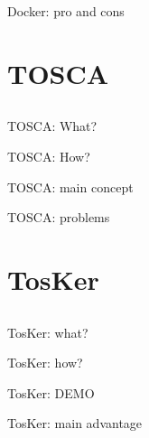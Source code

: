 \documentclass{beamer}
\begin{document}
  \begin{frame}{Docker: pro and cons}

  \end{frame}

\section{TOSCA}\subsection*{}

  \begin{frame}{TOSCA: What?}

  \end{frame}

  \begin{frame}{TOSCA: How?}

  \end{frame}

  \begin{frame}{TOSCA: main concept}

  \end{frame}

  \begin{frame}{TOSCA: problems}

  \end{frame}

\section{TosKer}\subsection*{}

  \begin{frame}{TosKer: what?}

  \end{frame}

  \begin{frame}{TosKer: how?}

  \end{frame}

  \begin{frame}{TosKer: DEMO}

  \end{frame}

  \begin{frame}{TosKer: main advantage}

  \end{frame}
\end{document}
